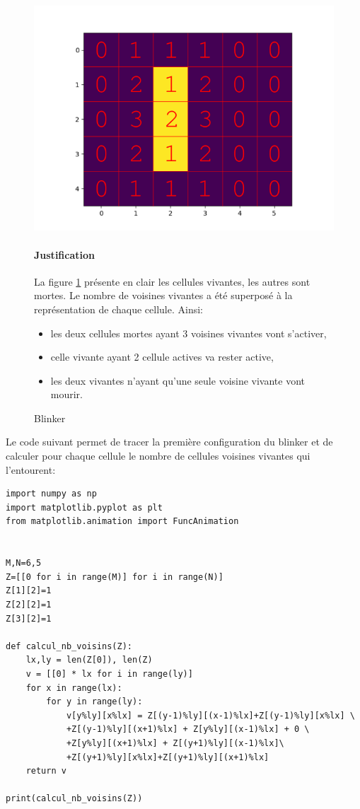 \begin{figure}[ht!]
 \begin{minipage}{0.3\linewidth}
 \includegraphics[width=\linewidth]{img/blinker_num}
 \vspace{-1cm}
 \caption{\label{fig01} Blinker}
 \end{minipage}\hfill
 \begin{minipage}{0.68\linewidth}
 \paragraph{Justification} La figure \ref{fig01} présente en clair les cellules vivantes, les autres sont mortes. Le nombre de voisines vivantes a été superposé à la représentation de chaque cellule. Ainsi:
	\begin{itemize}
 		\item les deux cellules mortes ayant 3 voisines vivantes vont s'activer,
		\item celle vivante ayant 2 cellule actives va rester active,
		\item les deux vivantes n'ayant qu'une seule voisine vivante vont mourir.
	\end{itemize}
 \end{minipage}
\end{figure}

Le code suivant permet de tracer la première configuration du blinker et de calculer pour chaque cellule le nombre de cellules voisines vivantes qui l'entourent:
\begin{verbatim}
import numpy as np
import matplotlib.pyplot as plt
from matplotlib.animation import FuncAnimation


M,N=6,5
Z=[[0 for i in range(M)] for i in range(N)]
Z[1][2]=1
Z[2][2]=1
Z[3][2]=1

def calcul_nb_voisins(Z):
    lx,ly = len(Z[0]), len(Z)
    v = [[0] * lx for i in range(ly)]
    for x in range(lx):
        for y in range(ly):
            v[y%ly][x%lx] = Z[(y-1)%ly][(x-1)%lx]+Z[(y-1)%ly][x%lx] \
            +Z[(y-1)%ly][(x+1)%lx] + Z[y%ly][(x-1)%lx] + 0 \
            +Z[y%ly][(x+1)%lx] + Z[(y+1)%ly][(x-1)%lx]\
            +Z[(y+1)%ly][x%lx]+Z[(y+1)%ly][(x+1)%lx]
    return v

print(calcul_nb_voisins(Z))
\end{verbatim}

